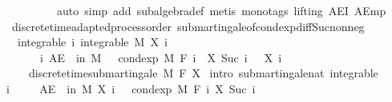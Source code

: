 \begin{isabellebody}
\ \ \ \ \ \ \ \ \ \ auto\ simp\ add{\isacharcolon}{\kern0pt}\ subalgebra{\isacharunderscore}{\kern0pt}def{\isacharcomma}{\kern0pt}\ metis\ {\isacharparenleft}{\kern0pt}mono{\isacharunderscore}{\kern0pt}tags{\isacharcomma}{\kern0pt}\ lifting{\isacharparenright}{\kern0pt}\ AE{\isacharunderscore}{\kern0pt}I{}\ AE{\isacharunderscore}{\kern0pt}mp{\isacharparenright}{\kern0pt}%
\endisatagproof
{\isafoldproof}%
%
\isadelimproof
\isanewline
%
\endisadelimproof
\isanewline
{}\isamarkupfalse%
\ {\isacharparenleft}{\kern0pt}\ discrete{\isacharunderscore}{\kern0pt}time{\isacharunderscore}{\kern0pt}adapted{\isacharunderscore}{\kern0pt}process{\isacharunderscore}{\kern0pt}order{\isacharparenright}{\kern0pt}\ submartingale{\isacharunderscore}{\kern0pt}of{\isacharunderscore}{\kern0pt}cond{\isacharunderscore}{\kern0pt}exp{\isacharunderscore}{\kern0pt}diff{\isacharunderscore}{\kern0pt}Suc{\isacharunderscore}{\kern0pt}nonneg{\isacharcolon}{\kern0pt}\isanewline
\ \ \ integrable{\isacharcolon}{\kern0pt}\ {\isachardoublequoteopen}{\isasymAnd}i{\isachardot}{\kern0pt}\ integrable\ M\ {\isacharparenleft}{\kern0pt}X\ i{\isacharparenright}{\kern0pt}{\isachardoublequoteclose}\ \isanewline
\ \ \ \ \ \ \ {\isachardoublequoteopen}{\isasymAnd}i{\isachardot}{\kern0pt}\ AE\ {\isasymxi}\ in\ M{\isachardot}{\kern0pt}\ {}\ {\isasymle}\ cond{\isacharunderscore}{\kern0pt}exp\ M\ {\isacharparenleft}{\kern0pt}F\ i{\isacharparenright}{\kern0pt}\ {\isacharparenleft}{\kern0pt}{\isasymlambda}{\isasymxi}{\isachardot}{\kern0pt}\ X\ {\isacharparenleft}{\kern0pt}Suc\ i{\isacharparenright}{\kern0pt}\ {\isasymxi}\ {\isacharminus}{\kern0pt}\ X\ i\ {\isasymxi}{\isacharparenright}{\kern0pt}\ {\isasymxi}{\isachardoublequoteclose}\ \isanewline
\ \ \ \ \ {\isachardoublequoteopen}discrete{\isacharunderscore}{\kern0pt}time{\isacharunderscore}{\kern0pt}submartingale\ M\ F\ X{\isachardoublequoteclose}\isanewline
%
\isadelimproof
%
\endisadelimproof
%
\isatagproof
{}\isamarkupfalse%
\ {\isacharparenleft}{\kern0pt}intro\ submartingale{\isacharunderscore}{\kern0pt}nat\ integrable{\isacharparenright}{\kern0pt}\ \isanewline
\ \ \isamarkupfalse%
\ i\ \isanewline
\ \ \isamarkupfalse%
\ {\isachardoublequoteopen}AE\ {\isasymxi}\ in\ M{\isachardot}{\kern0pt}\ X\ i\ {\isasymxi}\ {\isasymle}\ cond{\isacharunderscore}{\kern0pt}exp\ M\ {\isacharparenleft}{\kern0pt}F\ i{\isacharparenright}{\kern0pt}\ {\isacharparenleft}{\kern0pt}X\ {\isacharparenleft}{\kern0pt}Suc\ i{\isacharparenright}{\kern0pt}{\isacharparenright}{\kern0pt}\ {\isasymxi}{\isachardoublequoteclose}\ \isamarkupfalse%

\end{isabellebody}
